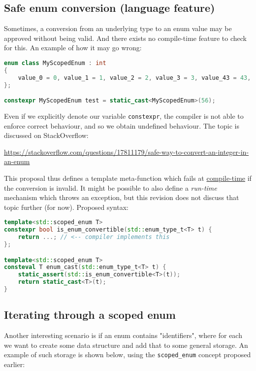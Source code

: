 \documentclass[
  format=manuscript,
  screen=true,
  review=false,
  nonacm=true,
  timestamp=true,
  balance=false]{acmart}
\begin{document}
\subsection{Safe enum conversion (language feature)}

Sometimes, a conversion from an underlying type to an enum value may be approved
without being valid. And there exists no compile-time feature to check for this.
An example of how it may go wrong:\vspace{2mm}

\begin{lstlisting}[language=Cpp]
enum class MyScopedEnum : int
{
    value_0 = 0, value_1 = 1, value_2 = 2, value_3 = 3, value_43 = 43, value_57 = 57
};

constexpr MyScopedEnum test = static_cast<MyScopedEnum>(56);
\end{lstlisting}

\noindent
Even if we explicitly denote our variable \texttt{constexpr}, the compiler is not
able to enforce correct behaviour, and so we obtain undefined behaviour. The topic
is discussed on StackOverflow:

\noindent
\url{https://stackoverflow.com/questions/17811179/safe-way-to-convert-an-integer-in-an-enum}

\vspace{3mm}\noindent
This proposal thus defines a template meta-function which fails at
\underline{compile-time} if the conversion is invalid. It might be possible to also
define a \textit{run-time} mechanism which throws an exception, but this revision
does not discuss that topic further (for now). Proposed syntax:\vspace{2mm}

\begin{lstlisting}[language=Cpp]
template<std::scoped_enum T>
constexpr bool is_enum_convertible(std::enum_type_t<T> t) {
    return ...; // <-- compiler implements this
};

template<std::scoped_enum T>
consteval T enum_cast(std::enum_type_t<T> t) {
    static_assert(std::is_enum_convertible<T>(t));
    return static_cast<T>(t);
}
\end{lstlisting}


\subsection{Iterating through a scoped enum}

Another interesting scenario is if an enum contains "identifiers", where for each we
want to create some data structure and add that to some general storage. An example
of such storage is shown below, using the \texttt{scoped\_enum} concept proposed
earlier:\vspace{2mm}
\end{document}
